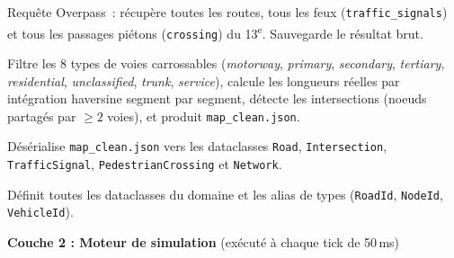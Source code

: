 \documentclass[a4paper,10pt]{article}
\begin{document}
\begin{description}[leftmargin=2em,itemsep=1pt]
  \item[\texttt{fetch\_osm.py}] Requ\^{e}te Overpass~: r\'{e}cup\`{e}re toutes les
  routes, tous les feux (\texttt{traffic\_signals}) et tous les passages
  pi\'{e}tons (\texttt{crossing}) du 13\textsuperscript{e}. Sauvegarde le r\'{e}sultat brut.

  \item[\texttt{clean\_json.py}] Filtre les 8 types de voies carrossables
  (\textit{motorway}, \textit{primary}, \textit{secondary}, \textit{tertiary},
  \textit{residential}, \textit{unclassified}, \textit{trunk}, \textit{service}),
  calcule les longueurs r\'{e}elles par int\'{e}gration haversine segment par segment,
  d\'{e}tecte les intersections (noeuds partag\'{e}s par $\geq 2$ voies),
  et produit \texttt{map\_clean.json}.

  \item[\texttt{loader.py}] D\'{e}s\'{e}rialise \texttt{map\_clean.json} vers les
  dataclasses \texttt{Road}, \texttt{Intersection},
  \texttt{TrafficSignal}, \texttt{PedestrianCrossing} et \texttt{Network}.

  \item[\texttt{models.py}] D\'{e}finit toutes les dataclasses du domaine
  et les alias de types (\texttt{RoadId}, \texttt{NodeId}, \texttt{VehicleId}).
\end{description}

\medskip
\noindent\textbf{Couche 2 : Moteur de simulation}
(ex\'{e}cut\'{e} \`{a} chaque tick de 50\,ms)
\end{document}
